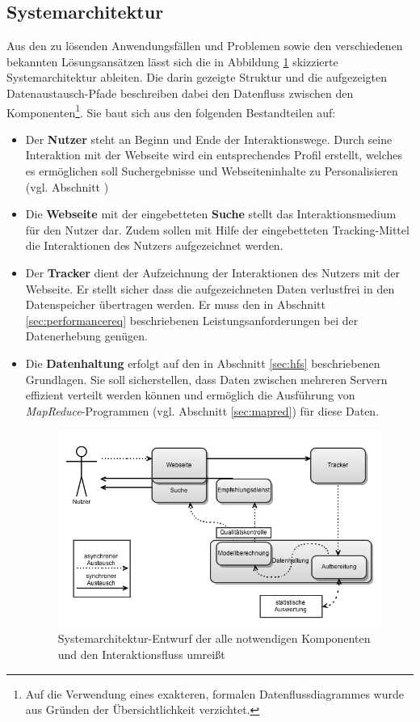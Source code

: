 \subsection{Systemarchitektur}\label{sec:system_rough}

Aus den zu lösenden Anwendungsfällen und Problemen sowie den verschiedenen bekannten Lösungsansätzen lässt sich die in Abbildung \ref{fig:system_rough} skizzierte Systemarchitektur ableiten. Die darin gezeigte Struktur und die aufgezeigten Datenaustausch-Pfade beschreiben dabei den Datenfluss zwischen den Komponenten\footnote{Auf die Verwendung eines exakteren, formalen Datenflussdiagrammes wurde aus Gründen der Übersichtlichkeit verzichtet.}. Sie baut sich aus den folgenden Bestandteilen auf:

\begin{itemize}
\item Der \textbf{Nutzer} steht an Beginn und Ende der Interaktionswege. Durch seine Interaktion mit der Webseite wird ein entsprechendes Profil erstellt, welches es ermöglichen soll Suchergebnisse und Webseiteninhalte  zu Personalisieren (vgl. Abschnitt \label{sec:userstories})
\item Die \textbf{Webseite} mit der eingebetteten \textbf{Suche} stellt das Interaktionsmedium für den Nutzer dar. Zudem sollen mit Hilfe der eingebetteten Tracking-Mittel die Interaktionen des Nutzers aufgezeichnet werden.
\item Der \textbf{Tracker} dient der Aufzeichnung der Interaktionen des Nutzers mit der Webseite. Er stellt sicher dass die aufgezeichneten Daten verlustfrei in den Datenspeicher übertragen werden. Er muss den in Abschnitt \ref{sec:performancereq} beschriebenen Leistungsanforderungen bei der Datenerhebung genügen.
\item Die \textbf{Datenhaltung} erfolgt auf den in Abschnitt \ref{sec:hfs} beschriebenen Grundlagen. Sie soll sicherstellen, dass Daten zwischen mehreren  Servern effizient verteilt werden können und ermöglich die Ausführung von \textit{MapReduce}-Programmen (vgl. Abschnitt \ref{sec:mapred}) für diese Daten.

\begin{figure}[H]
  \centering
    \includegraphics[width=\textwidth]{Abbildungen/Systemmodell.png}
    \caption[Systenarchitektur]{\footnotesize Systemarchitektur-Entwurf der alle notwendigen Komponenten und den Interaktionsfluss umreißt}
    \label{fig:system_rough}
\end{figure}


\end{itemize}
